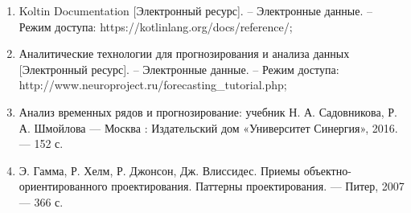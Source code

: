 
\begin{enumerate}
  \item Koltin Documentation [Электронный ресурс]. 
  – Электронные данные. – Режим доступа: https://kotlinlang.org/docs/reference/;
  \item Аналитические технологии для прогнозирования и анализа данных [Электронный ресурс]. 
  – Электронные данные. – Режим доступа: http://www.neuroproject.ru/forecasting_tutorial.php;
  \item Анализ временных рядов и прогнозирование: учебник
  Н. А. Садовникова, Р. А. Шмойлова --- Москва : Издательский дом «Университет Синергия», 2016. --- 152 с.
  \item Э. Гамма, Р. Хелм, Р. Джонсон, Дж. Влиссидес. Приемы
  объектно-ориентированного проектирования. Паттерны проектирования. --- Питер,
  2007 --- 366 с.
  
\end{enumerate}